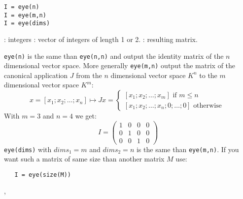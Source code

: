 \begin{mandesc}
\end{mandesc}
\begin{calling_sequence}
\begin{verbatim}
I = eye(n)
I = eye(m,n)
I = eye(dims)
\end{verbatim}
\end{calling_sequence}
\begin{parameters}
  \begin{varlist}
    : integers
    : vector of integers of length 1 or 2.
    : resulting matrix.
  \end{varlist}
\end{parameters}

\begin{mandescription}
\verb+eye(n)+ is the same than \verb+eye(n,n)+ and output the identity matrix of the $n$ dimensional
vector space. More generally \verb+eye(m,n)+ output the matrix of the canonical application $J$ from
the $n$ dimensional vector space $K^n$ to the  $m$ dimensional vector space $K^m$: 
$$
x = \left[ x_1 ; x_2 ; \dots ; x_n \right]  \longmapsto  J x = 
\left\{ 
\begin{array}{l} 
     \left[ x_1 ; x_2 ; \dots ; x_m \right] \mbox{ if } m \le n \\ \left[ x_1 ; x_2 ; \dots ; x_n ; 0 ; \dots ; 0 \right] \mbox{ otherwise }
\end{array} 
\right.
$$
With $m=3$ and $n=4$ we get:
$$
    I = \left( \begin{array}{cccc} 1 & 0 & 0 & 0 \\ 0 & 1 & 0 & 0 \\ 0 & 0 & 1 & 0
      \end{array} \right)
$$
\verb+eye(dims)+ with $dims_1 = m$ and $dims_2 = n$ is the same than  \verb+eye(m,n)+. If you want
such a matrix of same size than another matrix $M$ use: 
\begin{verbatim}
   I = eye(size(M))
\end{verbatim}

\end{mandescription}


\begin{examples}
\begin{program}
\end{program} 

\end{examples}

\begin{manseealso}
, 
\end{manseealso}

